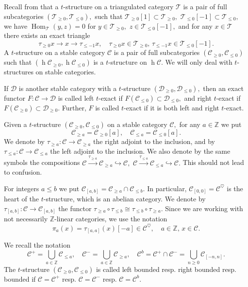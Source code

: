 \documentclass[11pt,leqno]{amsart}
\numberwithin{equation}{section}
\def\Z{\mathbb{Z}}
\def\h{\operatorname{h}}
\def\Hom{\operatorname{Hom}}
\newcommand{\xto}{\xrightarrow}
\newcommand{\hto}{\hookrightarrow}
\newcommand{\cD}{{\mathcal D}}
\newcommand{\cC}{{\mathcal C}}
\newcommand{\cT}{{\mathcal T}}
\begin{document}
Recall from \cite{BBD82} that a $t$-structure on a triangulated category $\cT$ is a pair of full subcategories $(\cT_{\geq 0},\cT_{\leq 0}),$ such that $\cT_{\geq 0}[1]\subset\cT_{\geq 0},$ $\cT_{\leq 0}[-1]\subset\cT_{\leq 0},$ we have $\Hom_{\cT}(y,z)=0$ for $y\in\cT_{\geq 0},$ $z\in\cT_{\leq 0}[-1],$ and for any $x\in\cT$ there exists an exact triangle
\begin{equation*}
\tau_{\geq 0}x\to x\to \tau_{\leq -1}x,\quad \tau_{\geq 0}x\in\cT_{\geq 0},\,\tau_{\leq -1}x\in\cT_{\leq 0}[-1].
\end{equation*}
A $t$-structure on a stable category $\cC$ is a pair of full subcategories $(\cC_{\geq 0},\cC_{\leq 0})$ such that $(\h \cC_{\geq 0},\h \cC_{\leq 0})$ is a $t$-structure on $\h \cC.$ We will only deal with $t$-structures on stable categories. 

If $\cD$ is another stable category with a $t$-structure $(\cD_{\geq 0},\cD_{\leq 0}),$ then an exact functor $F:\cC\to\cD$ is called left $t$-exact if $F(\cC_{\leq 0})\subset\cD_{\leq 0},$ and right $t$-exact if $F(\cC_{\geq 0})\subset\cD_{\geq 0}.$ Further, $F$ is called $t$-exact if it is both left and right $t$-exact.

Given a $t$-structure $(\cC_{\geq 0},\cC_{\leq 0})$ on a stable category $\cC,$ for any $a\in\Z$ we put
\begin{equation*}
\cC_{\geq a}=\cC_{\geq 0}[a],\quad \cC_{\leq a}=\cC_{\leq 0}[a].
\end{equation*}
We denote by $\tau_{\geq a}:\cC\to\cC_{\geq a}$ the right adjoint to the inclusion, and by $\tau_{\leq a}:\cC\to\cC_{\leq a}$ the left adjoint to the inclusion. We also denote by the same symbols the compositions $\cC\xto{\tau_{\geq a}}\cC_{\geq a}\hto\cC,$ $\cC\xto{\tau_{\leq a}}\cC_{\leq a}\hto\cC.$ This should not lead to confusion.

For integers $a\leq b$ we put $\cC_{[a,b]}=\cC_{\geq a}\cap\cC_{\leq b}.$ In particular, $\cC_{[0,0]}=\cC^{\heartsuit}$ is the heart of the $t$-structure, which is an abelian category. We denote by $\tau_{[a,b]}:\cC\to\cC_{[a,b]}$ the functor $\tau_{\geq a}\circ \tau_{\leq b}\cong\tau_{\leq b}\circ\tau_{\geq a}.$ Since we are working with not necessarily $\Z$-linear categories, we use the notation
\begin{equation*}
\pi_a(x)=\tau_{[a,a]}(x)[-a]\in\cC^{\heartsuit},\quad a\in\Z,\,x\in\cC.
\end{equation*}

We recall the notation
\begin{equation*}
\cC^+=\bigcup\limits_{a\in\Z}\cC_{\leq a},\quad \cC^-=\bigcup\limits_{a\in\Z}\cC_{\geq a},\quad \cC^b=\cC^+\cap\cC^-=\bigcup\limits_{n\geq 0}\cC_{[-n,n]}.
\end{equation*}
The $t$-structure $(\cC_{\geq 0},\cC_{\leq 0})$ is called left bounded resp. right bounded resp. bounded if $\cC=\cC^+$ resp. $\cC=\cC^-$ resp. $\cC=\cC^b.$ 
\end{document}
